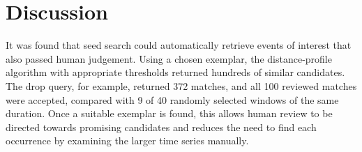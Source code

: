 
\section{Discussion}

It was found that seed search could automatically retrieve events of interest that also passed human judgement. Using a chosen exemplar, the distance-profile algorithm with appropriate thresholds returned hundreds of similar candidates. The drop query, for example, returned 372 matches, and all 100 reviewed matches were accepted, compared with 9 of 40 randomly selected windows of the same duration. Once a suitable exemplar is found, this allows human review to be directed towards promising candidates and reduces the need to find each occurrence by examining the larger time series manually.

